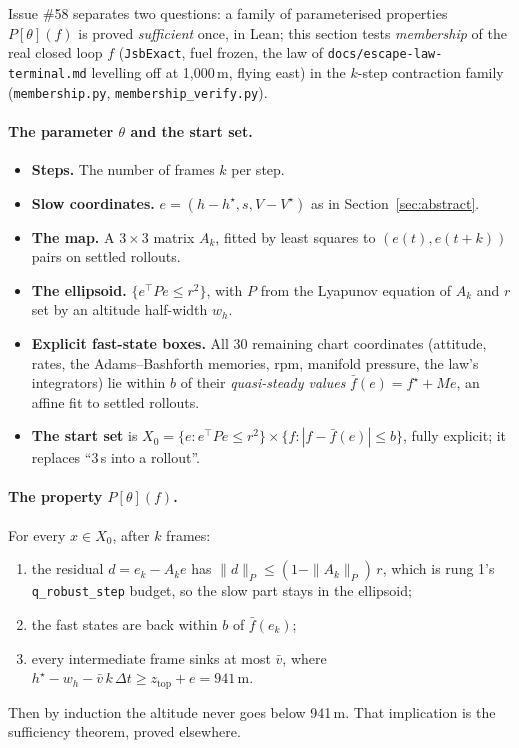 \documentclass[11pt]{article}
\newcommand{\zTop}{z_{\mathrm{top}}}
\begin{document}
Issue \#58 separates two questions: a family of parameterised properties $P[\theta](f)$ is proved \emph{sufficient} once, in Lean; this section tests \emph{membership} of the real closed loop $f$ (\texttt{JsbExact}, fuel frozen, the law of \texttt{docs/escape-law-terminal.md} levelling off at 1{,}000\,m, flying east) in the $k$-step contraction family (\texttt{membership.py}, \texttt{membership\_verify.py}).

\paragraph{The parameter $\theta$ and the start set.}
\begin{itemize}
\item \textbf{Steps.} The number of frames $k$ per step.
\item \textbf{Slow coordinates.} $e = (h - h^\star, s, V - V^\star)$ as in Section~\ref{sec:abstract}.
\item \textbf{The map.} A $3 \times 3$ matrix $A_k$, fitted by least squares to $(e(t), e(t+k))$ pairs on settled rollouts.
\item \textbf{The ellipsoid.} $\{e^\top P e \le r^2\}$, with $P$ from the Lyapunov equation of $A_k$ and $r$ set by an altitude half-width $w_h$.
\item \textbf{Explicit fast-state boxes.} All 30 remaining chart coordinates (attitude, rates, the Adams--Bashforth memories, rpm, manifold pressure, the law's integrators) lie within $b$ of their \emph{quasi-steady values} $\bar f(e) = f^\star + M e$, an affine fit to settled rollouts.
\item \textbf{The start set} is $X_0 = \{e : e^\top P e \le r^2\} \times \{f : |f - \bar f(e)| \le b\}$, fully explicit; it replaces ``3\,s into a rollout''.
\end{itemize}

\paragraph{The property $P[\theta](f)$.} For every $x \in X_0$, after $k$ frames:
\begin{enumerate}
\item[(a)] the residual $d = e_k - A_k e$ has $\|d\|_P \le (1 - \|A_k\|_P)\,r$, which is rung 1's \texttt{q\_robust\_step} budget, so the slow part stays in the ellipsoid;
\item[(b)] the fast states are back within $b$ of $\bar f(e_k)$;
\item[(c)] every intermediate frame sinks at most $\bar v$, where $h^\star - w_h - \bar v\,k\,\Delta t \ge \zTop + e = 941$\,m.
\end{enumerate}
Then by induction the altitude never goes below 941\,m. That implication is the sufficiency theorem, proved elsewhere.
\end{document}
